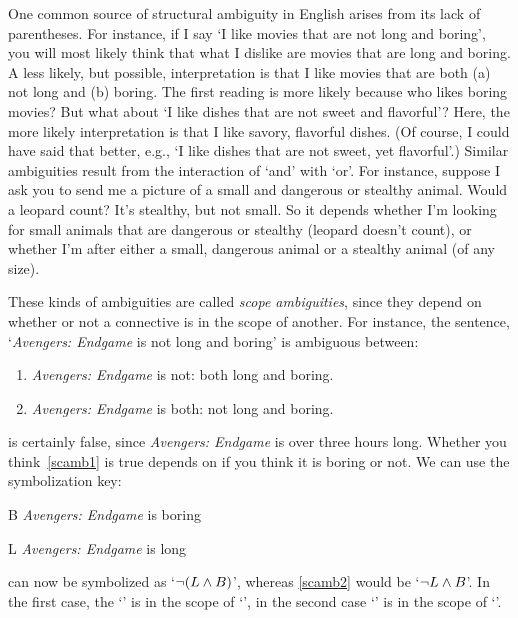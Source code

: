 One common source of structural ambiguity in English arises from its lack of parentheses. For instance, if I say `I like movies that are not long and boring', you will most likely think that what I dislike are movies that are long and boring. A less likely, but possible, interpretation is that I like movies that are both (a) not long and (b) boring. The first reading is more likely because who likes boring movies? But what about `I like dishes that are not sweet and flavorful'? Here, the more likely interpretation is that I like savory, flavorful dishes.  (Of course, I could have said that better, e.g., `I like dishes that are not sweet, yet flavorful'.) Similar ambiguities result from the interaction of `and' with `or'. For instance, suppose I ask you to send me a picture of a small and dangerous or stealthy animal.  Would a leopard count? It's stealthy, but not small. So it depends whether I'm looking for small animals that are dangerous or stealthy (leopard doesn't count), or whether I'm after either a small, dangerous animal or a stealthy animal (of any size).

These kinds of ambiguities are called \emph{scope ambiguities}, since they depend on whether or not a connective is in the scope of another. For instance, the sentence, `\textit{Avengers: Endgame} is not long and boring' is ambiguous between:
\begin{enumerate}
	\item\label{scamb1} \textit{Avengers: Endgame} is not: both long and boring.
	\item\label{scamb2} \textit{Avengers: Endgame} is both: not long and boring.
\end{enumerate}
 is certainly false, since \textit{Avengers: Endgame} is over three hours long. Whether you think~\cref*{scamb1} is true depends on if you think it is boring or not. We can use the symbolization key:
\begin{ekey}
	\item[B] \textit{Avengers: Endgame} is boring
	\item[L] \textit{Avengers: Endgame} is long
\end{ekey}
 can now be symbolized as `$\neg(L \wedge B)$', whereas \cref*{scamb2} would be `$\neg L \wedge B$'. In the first case, the `\eand' is in the scope of `\enot', in the second case `\enot' is in the scope of `\eand'.


